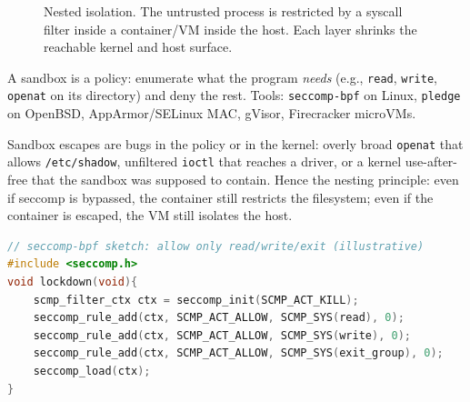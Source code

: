 \begin{figure}[h]\centering
{}
\caption{Nested isolation. The untrusted process is restricted by a syscall filter inside a container/VM inside the host. Each layer shrinks the reachable kernel and host surface.}
\label{fig:sandbox-nesting}
\end{figure}

A sandbox is a policy: enumerate what the program \emph{needs} (e.g., \texttt{read}, \texttt{write}, \texttt{openat} on its directory) and deny the rest. Tools: \texttt{seccomp-bpf} on Linux, \texttt{pledge} on OpenBSD, AppArmor/SELinux MAC, gVisor, Firecracker microVMs.

Sandbox escapes are bugs in the policy or in the kernel: overly broad \texttt{openat} that allows \texttt{/etc/shadow}, unfiltered \texttt{ioctl} that reaches a driver, or a kernel use-after-free that the sandbox was supposed to contain. Hence the nesting principle: even if seccomp is bypassed, the container still restricts the filesystem; even if the container is escaped, the VM still isolates the host.

\begin{lstlisting}[language=C]
// seccomp-bpf sketch: allow only read/write/exit (illustrative)
#include <seccomp.h>
void lockdown(void){
    scmp_filter_ctx ctx = seccomp_init(SCMP_ACT_KILL);
    seccomp_rule_add(ctx, SCMP_ACT_ALLOW, SCMP_SYS(read), 0);
    seccomp_rule_add(ctx, SCMP_ACT_ALLOW, SCMP_SYS(write), 0);
    seccomp_rule_add(ctx, SCMP_ACT_ALLOW, SCMP_SYS(exit_group), 0);
    seccomp_load(ctx);
}
\end{lstlisting}

